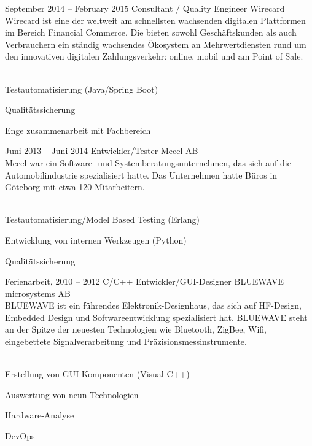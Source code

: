 \documentclass[fontsize=10pt]{tccv}
\begin{document}
\begin{eventlist}
\item{September 2014 -- February 2015}
      {Consultant / Quality Engineer}
      {Wirecard}
\\
Wirecard ist eine der weltweit am schnellsten wachsenden digitalen Plattformen
im Bereich Financial Commerce. Die bieten sowohl Geschäftskunden als
auch Verbrauchern ein ständig wachsendes Ökosystem an Mehrwertdiensten
rund um den innovativen digitalen Zahlungsverkehr: online, mobil und am
Point of Sale.
\\\\
\begin{assignments}
\item{Testautomatisierung (Java/Spring Boot)}
\item{Qualitätssicherung}
\item{Enge zusammenarbeit mit Fachbereich}
\end{assignments}

\newpage

\item{Juni 2013 -- Juni 2014}
     {Entwickler/Tester}
     {Mecel AB}
\\
Mecel war ein Software- und Systemberatungsunternehmen, das sich auf die
Automobilindustrie spezialisiert hatte. Das Unternehmen hatte Büros in
Göteborg mit etwa 120 Mitarbeitern.
\\\\
\begin{assignments}
\item{Testautomatisierung/Model Based Testing (Erlang)}
\item{Entwicklung von internen Werkzeugen (Python)}
\item{Qualitätssicherung}
\end{assignments}

\item{Ferienarbeit, 2010 -- 2012}
     {C/C++ Entwickler/GUI-Designer}
     {BLUEWAVE microsystems AB}
\\
BLUEWAVE ist ein führendes Elektronik-Designhaus, das sich auf HF-Design,
Embedded Design und Softwareentwicklung spezialisiert hat. BLUEWAVE steht an
der Spitze der neuesten Technologien wie Bluetooth, ZigBee, Wifi, eingebettete
Signalverarbeitung und Präzisionsmessinstrumente.
\\\\
\begin{assignments}
\item{Erstellung von GUI-Komponenten (Visual C++)}
\item{Auswertung von neun Technologien }
\item{Hardware-Analyse}
\item{DevOps}
\end{assignments}

\end{eventlist}
\end{document}

